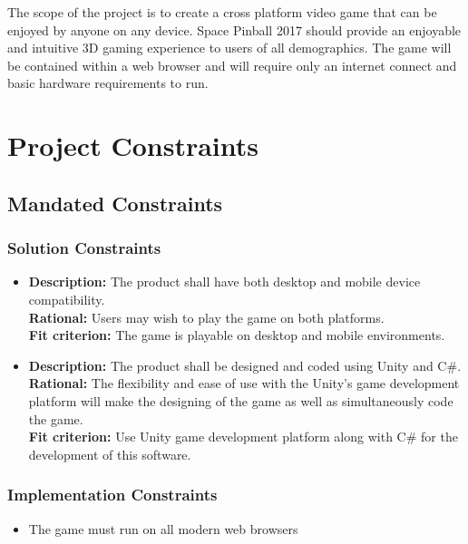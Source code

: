 \documentclass[12pt]{article}
\begin{document}
The scope of the project is to create a cross platform video game that can be enjoyed by anyone on any device. Space Pinball 2017 should provide an enjoyable and intuitive 3D gaming experience  to users of all demographics. The game will be contained within a web browser and will require only an internet connect and basic hardware requirements to run.


\section{Project Constraints}

\subsection{Mandated Constraints}
\subsubsection{Solution Constraints}

\begin{itemize}
\item \textbf{Description:} The product shall have both desktop and mobile device compatibility.\\
\textbf{Rational:} Users may wish to play the game on both platforms.\\
\textbf{Fit criterion:} The game is playable on desktop and mobile environments.\\


\item \textbf{Description:} The product shall be designed and coded using Unity and C\#.\\
\textbf{Rational:} The flexibility and ease of use with the Unity's game development platform will make the designing of the game as well as simultaneously code the game.\\
\textbf{Fit criterion:} Use Unity game development platform along with C\# for the development of this software.\\
\end{itemize}

\subsubsection{Implementation Constraints}

\begin{itemize}
\item The game must run on all modern web browsers
\end{itemize}
\end{document}
